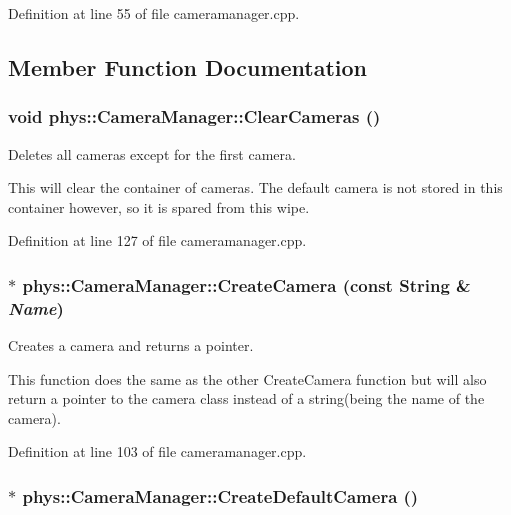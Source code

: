 Definition at line 55 of file cameramanager.cpp.



\subsection{Member Function Documentation}
\hypertarget{classphys_1_1CameraManager_a76bebee0820fcfa462412cb112b1b874}{
\subsubsection[{ClearCameras}]{\setlength{\rightskip}{0pt plus 5cm}void phys::CameraManager::ClearCameras ()}}
\label{d9/d91/classphys_1_1CameraManager_a76bebee0820fcfa462412cb112b1b874}


Deletes all cameras except for the first camera. 

This will clear the container of cameras. The default camera is not stored in this container however, so it is spared from this wipe. 

Definition at line 127 of file cameramanager.cpp.

\hypertarget{classphys_1_1CameraManager_a3681545c19a96ae62032204a6f4a602b}{
\subsubsection[{CreateCamera}]{ $\ast$ phys::CameraManager::CreateCamera (const {\bf String} \& {\em Name})}}
\label{d9/d91/classphys_1_1CameraManager_a3681545c19a96ae62032204a6f4a602b}


Creates a camera and returns a pointer. 

This function does the same as the other CreateCamera function but will also return a pointer to the camera class instead of a string(being the name of the camera). 

Definition at line 103 of file cameramanager.cpp.

\hypertarget{classphys_1_1CameraManager_a80f7dd510a31264d74e7f5a53bdf86a9}{
\subsubsection[{CreateDefaultCamera}]{ $\ast$ phys::CameraManager::CreateDefaultCamera ()}}
\label{d9/d91/classphys_1_1CameraManager_a80f7dd510a31264d74e7f5a53bdf86a9}


